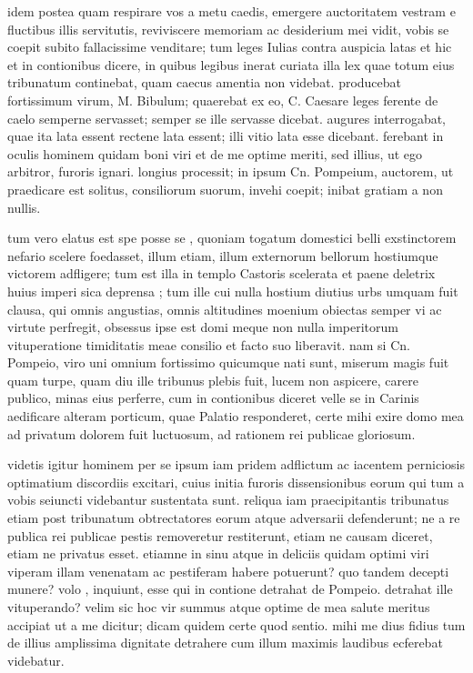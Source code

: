  idem postea quam respirare vos a metu caedis, emergere auctoritatem vestram e fluctibus illis servitutis, reviviscere memoriam ac desiderium mei vidit, vobis se coepit subito fallacissime venditare; tum leges Iulias contra auspicia latas et hic et in contionibus dicere, in quibus legibus inerat curiata illa lex quae totum eius tribunatum continebat, quam caecus amentia non videbat. producebat fortissimum virum, M. Bibulum; quaerebat ex eo, C. Caesare leges ferente de caelo semperne servasset; semper se ille servasse dicebat. augures interrogabat, quae ita lata essent rectene lata essent; illi vitio lata esse dicebant. ferebant in oculis hominem quidam boni viri et de me optime meriti, sed illius, ut ego arbitror, furoris ignari. longius processit; in ipsum Cn. Pompeium, auctorem, ut praedicare est solitus, consiliorum suorum, invehi coepit; inibat gratiam a non nullis.

 tum vero elatus est spe posse se , quoniam togatum domestici belli exstinctorem nefario scelere foedasset, illum etiam, illum externorum bellorum hostiumque victorem adfligere; tum est illa in templo Castoris scelerata et paene deletrix huius imperi sica deprensa ; tum ille cui nulla hostium diutius urbs umquam fuit clausa, qui omnis angustias, omnis altitudines moenium obiectas semper vi ac virtute perfregit, obsessus ipse est domi meque non nulla imperitorum vituperatione timiditatis meae consilio et facto suo liberavit. nam si Cn. Pompeio, viro uni omnium fortissimo quicumque nati sunt, miserum magis fuit quam turpe, quam diu ille tribunus plebis fuit, lucem non aspicere, carere publico, minas eius perferre, cum in contionibus diceret velle se in Carinis aedificare alteram porticum, quae Palatio responderet, certe mihi exire domo mea ad privatum dolorem fuit luctuosum, ad rationem rei publicae gloriosum.

 videtis igitur hominem per se ipsum iam pridem adflictum ac iacentem perniciosis optimatium discordiis excitari, cuius initia furoris dissensionibus eorum qui tum a vobis seiuncti videbantur sustentata sunt. reliqua iam praecipitantis tribunatus etiam post tribunatum obtrectatores eorum atque adversarii defenderunt; ne a re publica rei publicae pestis removeretur restiterunt, etiam ne causam diceret, etiam ne privatus esset. etiamne in sinu atque in deliciis quidam optimi viri viperam illam venenatam ac pestiferam habere potuerunt? quo tandem decepti munere? volo , inquiunt, esse qui in contione detrahat de Pompeio. detrahat ille vituperando? velim sic hoc vir summus atque optime de mea salute meritus accipiat ut a me dicitur; dicam quidem certe quod sentio. mihi me dius fidius tum de illius amplissima dignitate detrahere cum illum maximis laudibus ecferebat videbatur.

